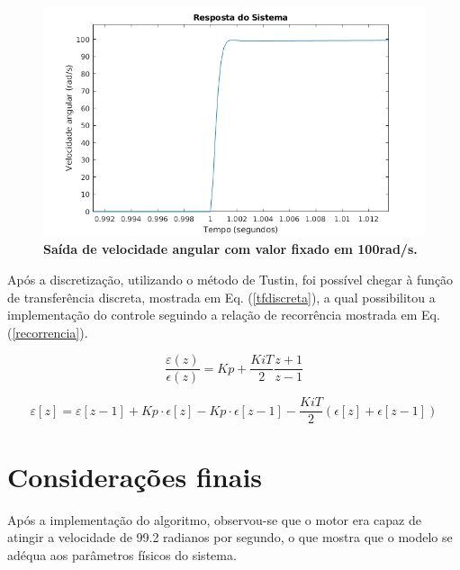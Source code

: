 \documentclass[10pt,fleqn,a4paper]{article}
\begin{document}
	\begin{figure}[ht]
		\begin{center}
			\includegraphics[angle=0, scale=0.6]{images/sistemStep}
		\end{center}
		\caption{\textbf{Saída de velocidade angular com valor fixado em 100rad/s.}}
		\label{fig:saidasimulada}
	\end{figure}
    
    Após a discretização, utilizando o método de Tustin, foi possível chegar à função de transferência discreta, mostrada em Eq. (\ref{tfdiscreta}), a qual possibilitou a implementação do controle seguindo a relação de recorrência mostrada em Eq. (\ref{recorrencia}).
    
    \begin{equation}
    \frac{\varepsilon(z)}{\epsilon(z)}= Kp + \frac{Ki T}{2}\frac{z+1}{z-1} \label{tfdiscreta}
    \end{equation}
    
    \begin{equation}
    \varepsilon[z] = \varepsilon[z-1] + Kp\cdot\epsilon[z] - Kp\cdot\epsilon[z-1] - \frac{Ki T}{2}(\epsilon[z] + \epsilon[z-1]) \label{recorrencia}
    \end{equation}
    
    \newpage
    
    \section{Considerações finais}
    
    Após a implementação do algoritmo, observou-se que o motor era capaz de atingir a velocidade de 99.2 radianos por segundo, o que mostra que o modelo se adéqua aos parâmetros físicos do sistema.
    
\end{document}
